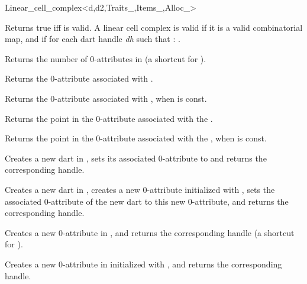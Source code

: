 \begin{ccRefClass}{Linear_cell_complex<d,d2,Traits_,Items_,Alloc_>}

         {Returns true iff  is valid.}
A linear cell complex  is valid  
if it is a valid combinatorial map, and if for each dart handle \emph{dh} such that 
\myin{}: .


{Returns the number of 0-attributes in 
       (a shortcut for ).}
 

{Returns the 0-attribute associated with .
}

{Returns the 0-attribute associated with , when  is const.
}

{Returns the point in the 0-attribute associated with the .
}

{Returns the point in the 0-attribute associated with the , 
  when  is const.
}

   {Creates a new dart in , sets its associated 0-attribute
     to  and returns the corresponding handle.
   }

{Creates a new dart in , creates a new 0-attribute 
  initialized with , sets the associated 0-attribute
  of the new dart to this new 0-attribute, 
  and returns the corresponding handle.}

{Creates a new 0-attribute in , and returns the corresponding handle
  (a shortcut for ).}

{Creates a new 0-attribute in  initialized with ,
  and returns the corresponding handle.}


\end{ccRefClass}
